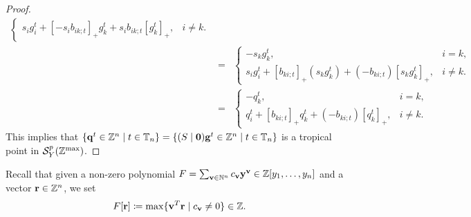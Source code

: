 \documentclass[12pt]{amsart}
\theoremstyle{definition}
\theoremstyle{remark}
\numberwithin{equation}{section}
\begin{document}
\begin{proof}
\begin{eqnarray}
\begin{cases}
        s_ig_{i}^t+[-s_ib_{ik;t}]_+g_{k}^t+s_ib_{ik;t}[g_{k}^t]_+,&{i\neq k}.
    \end{cases}\nonumber\\
    &=&\begin{cases}-s_kg_{k}^t, &{i=k,}\\
        s_ig_{i}^t+[b_{ki;t}]_+(s_kg_{k}^t)+(-b_{ki;t})[s_kg_{k}^t]_+,&{i\neq k}.
    \end{cases}\nonumber\\
     &=&\begin{cases}-q_k^t, &{i=k,}\\
        q_{i}^t+[b_{ki;t}]_+q_{k}^t+(-b_{ki;t})[q_{k}^t]_+,&{i\neq k}.
    \end{cases}\nonumber
\end{eqnarray}
This implies that $\{{\bf q}^t\in\mathbb Z^n\mid t\in\mathbb T_n\}=\{ (S\mid {\bf 0}){\bf g}^t\in\mathbb Z^n\mid t\in\mathbb T_n\}$ is a tropical point in  $\mathcal S_Y^p(\mathbb Z^{\rm max})$. 
\end{proof}



Recall that  given a non-zero polynomial $F=\sum_{{\bf v}\in\mathbb N^n}c_{{\bf v}}{\bf y}^{{\bf v}}\in\mathbb Z[y_1,\ldots,y_n]$  and a vector ${\bf r}\in \mathbb Z^n$, we set
$$F[{\bf r}]\coloneqq \max\{{\bf v}^T{\bf r}\mid c_{{\bf v}}\neq 0\}\in\mathbb Z.$$
 
\end{document}
